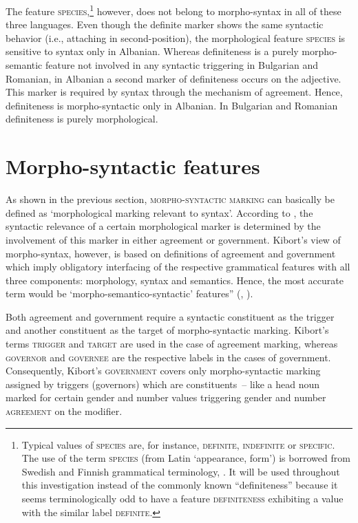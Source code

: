 The feature \textsc{species},\footnote{Typical values of \textsc{species} are, for instance, \textsc{definite, indefinite} or \textsc{specific}. The use of the term \textsc{species} (from Latin ‘appearance, form’) is borrowed from Swedish and Finnish grammatical terminology, \citep[cf., e.g.,][]{holm-etal1970,itkonen-t1980a}. It will be used throughout this investigation instead of the commonly known “definiteness” because it seems terminologically odd to have a feature \textsc{definiteness} exhibiting a value with the similar label \textsc{definite}.} however, does not belong to morpho-syntax in all of these three languages. Even though the definite marker shows the same syntactic behavior (i.e., attaching in second-position), the morphological feature \textsc{species} is sensitive to syntax only in Albanian. Whereas definiteness is a purely morpho-semantic feature not involved in any syntactic triggering in Bulgarian and Romanian, in Albanian a second marker of definiteness occurs on the adjective. This marker is required by syntax through the mechanism of agreement. Hence, definiteness is morpho-syntactic only in Albanian. In Bulgarian and Romanian definiteness is purely morphological.

\section{Morpho-syntactic features}
\label{crit eval}
As shown in the previous section, \textsc{morpho-syntactic marking} can basically be defined as ‘morphological marking relevant to syntax’. According to \citet{kibort2010a}, the syntactic relevance of a certain morphological marker is determined by the involvement of this marker in either agreement or government. Kibort's view of morpho-syntax, however, is based on definitions of agreement and government which imply obligatory interfacing of the respective grammatical features with all three components: morphology, syntax and semantics. Hence, the most accurate term would be ‘morpho-semantico-syntactic’ features” (\citealt{kibort2008a}, \citealt[cf.~also]{kibort2010a}).

Both agreement and government require a syntactic constituent as the trigger and another constituent as the target of morpho-syntactic marking. Kibort's terms \textsc{trigger} and \textsc{target} are used in the case of agreement marking, whereas \textsc{governor} and \textsc{governee} are the respective labels in the cases of government. Consequently, Kibort's \textsc{government} covers only morpho-syntactic marking assigned by triggers (governors) which are constituents~– like a head noun marked for certain gender and number values triggering gender and number \textsc{agreement} on the modifier.

